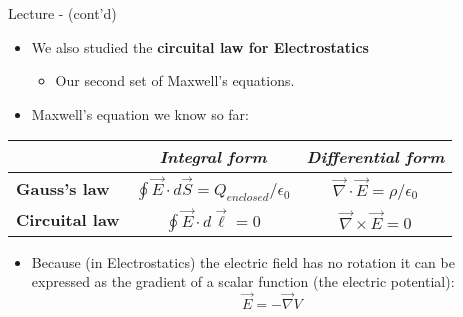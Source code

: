 \begin{frame}{Lecture \summarizedlecture - \lecturesummarytitle (cont'd)}

\begin{itemize}
  \item We also studied the {\bf circuital law for Electrostatics}
     \begin{itemize}
        \item Our second set of Maxwell's equations.
     \end{itemize}
  \vspace{0.2cm}
  \item Maxwell's equation we know so far:
\end{itemize}

\begin{center}
 {
  \begin{table}[H]
    \begin{tabular}{|l|c|c|}
      \hline
          & {\it Integral form} & {\it Differential form} \\
      \hline
      {\bf Gauss's law} &
        $\oint \vec{E} \cdot d\vec{S} = Q_{enclosed} / \epsilon_0$ &
        $\vec{\nabla} \cdot \vec{E} = \rho / \epsilon_0$ \\

      {\bf Circuital law} &
        $\oint \vec{E} \cdot d\vec{\ell} = 0$ &
        $\vec{\nabla} \times \vec{E} = 0$ \\
      \hline
    \end{tabular}
  \end{table}
 }
\end{center}

\begin{itemize}
  \item Because (in Electrostatics) the electric field has no rotation
        it can be expressed as the gradient of a scalar function (the electric potential):
        \begin{equation*}
           \vec{E} = - \vec{\nabla} V
        \end{equation*}
\end{itemize}


\end{frame}

%
%
%

